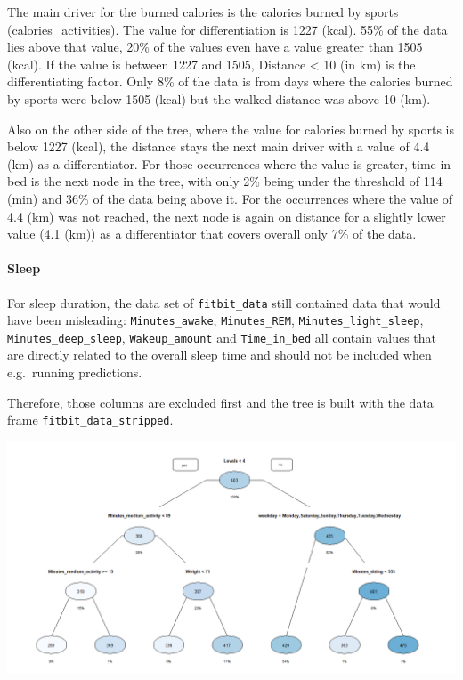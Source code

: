 \documentclass[
]{article}
\begin{document}
The main driver for the burned calories is the calories burned by sports
(calories\_activities). The value for differentiation is 1227 (kcal).
55\% of the data lies above that value, 20\% of the values even have a
value greater than 1505 (kcal). If the value is between 1227 and 1505,
Distance \textless{} 10 (in km) is the differentiating factor. Only 8\%
of the data is from days where the calories burned by sports were below
1505 (kcal) but the walked distance was above 10 (km).

Also on the other side of the tree, where the value for calories burned
by sports is below 1227 (kcal), the distance stays the next main driver
with a value of 4.4 (km) as a differentiator. For those occurrences
where the value is greater, time in bed is the next node in the tree,
with only 2\% being under the threshold of 114 (min) and 36\% of the
data being above it. For the occurrences where the value of 4.4 (km) was
not reached, the next node is again on distance for a slightly lower
value (4.1 (km)) as a differentiator that covers overall only 7\% of the
data.

\hypertarget{sleep}{%
\paragraph{Sleep}\label{sleep}}

For sleep duration, the data set of \texttt{fitbit\_data} still
contained data that would have been misleading: \texttt{Minutes\_awake},
\texttt{Minutes\_REM}, \texttt{Minutes\_light\_sleep},
\texttt{Minutes\_deep\_sleep}, \texttt{Wakeup\_amount} and
\texttt{Time\_in\_bed} all contain values that are directly related to
the overall sleep time and should not be included when e.g.~running
predictions.

Therefore, those columns are excluded first and the tree is built with
the data frame \texttt{fitbit\_data\_stripped}.

\includegraphics{./cd7f2afec0cdb99ee7abbf92e5e9d4e10143edc0.png}
\end{document}
